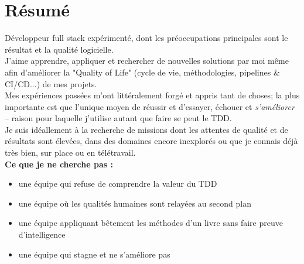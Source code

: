 \documentclass[]{friggeri-cv}
\begin{document}
\section{Résumé}
Développeur full stack expérimenté, dont les préoccupations principales sont le résultat et la qualité logicielle.\\
J'aime apprendre, appliquer et rechercher de nouvelles solutions par moi même afin d'améliorer la "Quality of Life" (cycle de vie, méthodologies, pipelines \& CI/CD...) de mes projets.\\
Mes expériences passées m'ont littéralement forgé et appris tant de choses; la plus importante est que l'unique moyen de réussir et d'essayer, échouer et \textit{s'améliorer} -- raison pour laquelle j'utilise autant que faire se peut le TDD.\\
Je suis idéallement à la recherche de missions dont les attentes de qualité et de résultats sont élevées, dans des domaines encore inexplorés ou que je connais déjà très bien, sur place ou en télétravail.\\
\textbf{Ce que je ne cherche pas :}
\begin{itemize}
\item une équipe qui refuse de comprendre la valeur du TDD
\vspace{-\baselineskip}
\vspace{1 ex}
\item une équipe où les qualités humaines sont relayées au second plan
\vspace{-\baselineskip}
\vspace{1 ex}
\item une équipe appliquant bêtement les méthodes d'un livre sans faire preuve d'intelligence
\vspace{-\baselineskip}
\vspace{-\baselineskip}
\vspace{1 ex}
\item une équipe qui stagne et ne s'améliore pas
\end{itemize}
\end{document}
